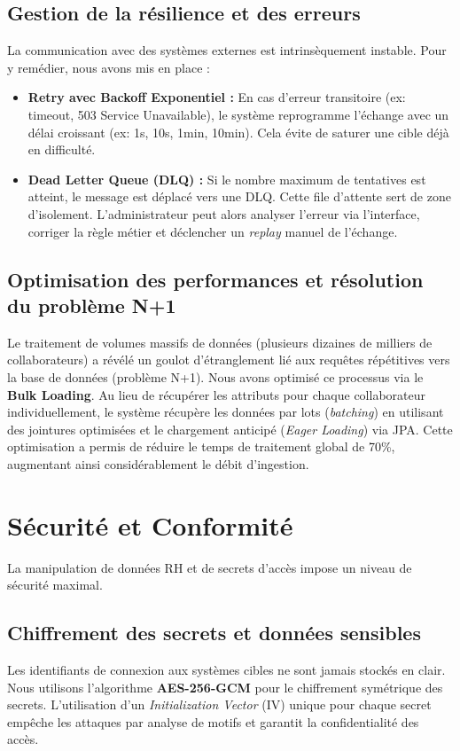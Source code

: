 \subsection{Gestion de la résilience et des erreurs}
La communication avec des systèmes externes est intrinsèquement instable. Pour y remédier, nous avons mis en place :
\begin{itemize}
    \item \textbf{Retry avec Backoff Exponentiel :} En cas d'erreur transitoire (ex: timeout, 503 Service Unavailable), le système reprogramme l'échange avec un délai croissant (ex: 1s, 10s, 1min, 10min). Cela évite de saturer une cible déjà en difficulté.
    \item \textbf{Dead Letter Queue (DLQ) :} Si le nombre maximum de tentatives est atteint, le message est déplacé vers une DLQ. Cette file d'attente sert de zone d'isolement. L'administrateur peut alors analyser l'erreur via l'interface, corriger la règle métier et déclencher un \textit{replay} manuel de l'échange.
\end{itemize}

\subsection{Optimisation des performances et résolution du problème N+1}
Le traitement de volumes massifs de données (plusieurs dizaines de milliers de collaborateurs) a révélé un goulot d'étranglement lié aux requêtes répétitives vers la base de données (problème N+1). Nous avons optimisé ce processus via le \textbf{Bulk Loading}. 
Au lieu de récupérer les attributs pour chaque collaborateur individuellement, le système récupère les données par lots (\textit{batching}) en utilisant des jointures optimisées et le chargement anticipé (\textit{Eager Loading}) via JPA. Cette optimisation a permis de réduire le temps de traitement global de 70\%, augmentant ainsi considérablement le débit d'ingestion.

\section{Sécurité et Conformité}
\label{sec:securite}

La manipulation de données RH et de secrets d'accès impose un niveau de sécurité maximal.

\subsection{Chiffrement des secrets et données sensibles}
Les identifiants de connexion aux systèmes cibles ne sont jamais stockés en clair. Nous utilisons l'algorithme \textbf{AES-256-GCM} pour le chiffrement symétrique des secrets. L'utilisation d'un \textit{Initialization Vector} (IV) unique pour chaque secret empêche les attaques par analyse de motifs et garantit la confidentialité des accès.

